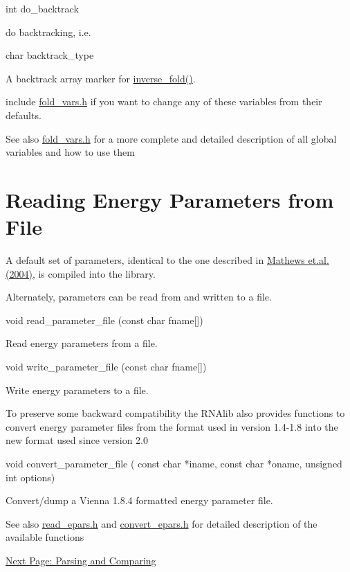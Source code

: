 \begin{DoxyVerb}
int do_backtrack
\end{DoxyVerb}
 do backtracking, i.e. 

\begin{DoxyVerb}
char backtrack_type
\end{DoxyVerb}
 A backtrack array marker for \hyperlink{inverse_8h_a7af026de55d4babad879f2c92559cbbc}{inverse\_\-fold()}. 

include \hyperlink{fold__vars_8h}{fold\_\-vars.h} if you want to change any of these variables from their defaults.

\begin{DoxySeeAlso}{See also}
\hyperlink{fold__vars_8h}{fold\_\-vars.h} for a more complete and detailed description of all global variables and how to use them
\end{DoxySeeAlso}
\hypertarget{mp__fold_mp_Param_Files}{}\section{Reading Energy Parameters from File}\label{mp__fold_mp_Param_Files}
A default set of parameters, identical to the one described in \hyperlink{mp__ref_mathews_04}{Mathews et.al. (2004)}, is compiled into the library.\par
 Alternately, parameters can be read from and written to a file.

\begin{DoxyVerb}
void  read_parameter_file (const char fname[])
\end{DoxyVerb}
 Read energy parameters from a file. 

\begin{DoxyVerb}
void  write_parameter_file (const char fname[])
\end{DoxyVerb}
 Write energy parameters to a file. 

To preserve some backward compatibility the RNAlib also provides functions to convert energy parameter files from the format used in version 1.4-\/1.8 into the new format used since version 2.0

\begin{DoxyVerb}
void convert_parameter_file (
            const char *iname,
            const char *oname,
            unsigned int options)
\end{DoxyVerb}
 Convert/dump a Vienna 1.8.4 formatted energy parameter file. 

\begin{DoxySeeAlso}{See also}
\hyperlink{read__epars_8h}{read\_\-epars.h} and \hyperlink{convert__epars_8h}{convert\_\-epars.h} for detailed description of the available functions
\end{DoxySeeAlso}


\hyperlink{mp__parse}{Next Page: Parsing and Comparing} 